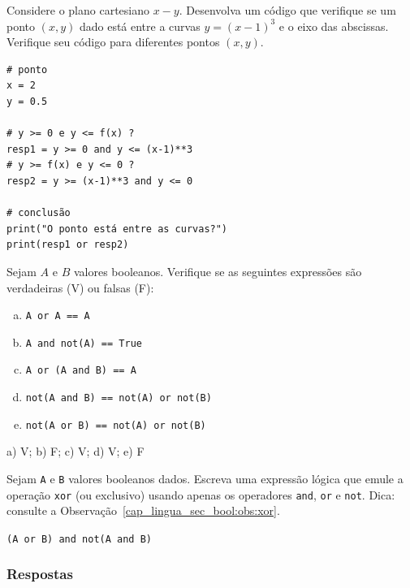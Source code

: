 \begin{exer}
  Considere o plano cartesiano $x-y$. Desenvolva um código que verifique se um ponto $(x, y)$ dado está entre a curvas $y = (x-1)^3$ e o eixo das abscissas. Verifique seu código para diferentes pontos $(x, y)$.
\end{exer}
\begin{resp}

\begin{lstlisting}
# ponto
x = 2
y = 0.5

# y >= 0 e y <= f(x) ?
resp1 = y >= 0 and y <= (x-1)**3
# y >= f(x) e y <= 0 ?
resp2 = y >= (x-1)**3 and y <= 0

# conclusão
print("O ponto está entre as curvas?")
print(resp1 or resp2)
\end{lstlisting}

\end{resp}

\begin{exer}
  Sejam $A$ e $B$ valores booleanos. Verifique se as seguintes expressões são verdadeiras (V) ou falsas (F):
  \begin{enumerate}[a)]
  \item \lstinline+A or A == A+
  \item \lstinline+A and not(A) == True+
  \item \lstinline+A or (A and B) == A+
  \item \lstinline+not(A and B) == not(A) or not(B)+
  \item \lstinline+not(A or B) == not(A) or not(B)+
  \end{enumerate}
\end{exer}
\begin{resp}
  a) V; b) F; c) V; d) V; e) F
\end{resp}

\begin{exer}\label{cap_lingua_sec_bool:exer:xor}
  Sejam \lstinline+A+ e \lstinline+B+ valores booleanos dados. Escreva uma expressão lógica que emule a operação \lstinline+xor+ (ou exclusivo) usando apenas os operadores \lstinline+and+, \lstinline+or+ e \lstinline+not+. Dica: consulte a Observação~\ref{cap_lingua_sec_bool:obs:xor}.
\end{exer}
\begin{resp}
  \lstinline+(A or B) and not(A and B)+
\end{resp}

\ifisbook
\subsubsection{Respostas}
\shipoutAnswer
\fi

